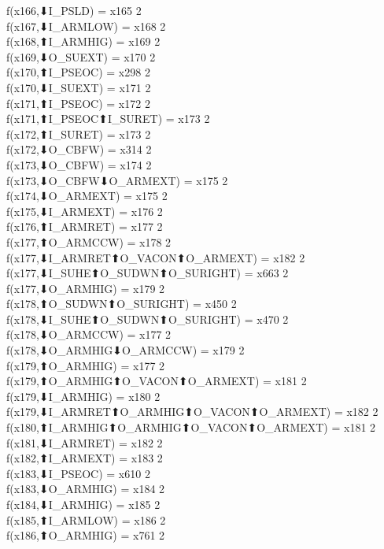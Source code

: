 f(x166,⬇I_PSLD) = x165 {2} \\
f(x167,⬇I_ARMLOW) = x168 {2} \\
f(x168,⬆I_ARMHIG) = x169 {2} \\
f(x169,⬇O_SUEXT) = x170 {2} \\
f(x170,⬆I_PSEOC) = x298 {2} \\
f(x170,⬇I_SUEXT) = x171 {2} \\
f(x171,⬆I_PSEOC) = x172 {2} \\
f(x171,⬆I_PSEOC⬆I_SURET) = x173 {2} \\
f(x172,⬆I_SURET) = x173 {2} \\
f(x172,⬇O_CBFW) = x314 {2} \\
f(x173,⬇O_CBFW) = x174 {2} \\
f(x173,⬇O_CBFW⬇O_ARMEXT) = x175 {2} \\
f(x174,⬇O_ARMEXT) = x175 {2} \\
f(x175,⬇I_ARMEXT) = x176 {2} \\
f(x176,⬆I_ARMRET) = x177 {2} \\
f(x177,⬆O_ARMCCW) = x178 {2} \\
f(x177,⬇I_ARMRET⬆O_VACON⬆O_ARMEXT) = x182 {2} \\
f(x177,⬇I_SUHE⬆O_SUDWN⬆O_SURIGHT) = x663 {2} \\
f(x177,⬇O_ARMHIG) = x179 {2} \\
f(x178,⬆O_SUDWN⬆O_SURIGHT) = x450 {2} \\
f(x178,⬇I_SUHE⬆O_SUDWN⬆O_SURIGHT) = x470 {2} \\
f(x178,⬇O_ARMCCW) = x177 {2} \\
f(x178,⬇O_ARMHIG⬇O_ARMCCW) = x179 {2} \\
f(x179,⬆O_ARMHIG) = x177 {2} \\
f(x179,⬆O_ARMHIG⬆O_VACON⬆O_ARMEXT) = x181 {2} \\
f(x179,⬇I_ARMHIG) = x180 {2} \\
f(x179,⬇I_ARMRET⬆O_ARMHIG⬆O_VACON⬆O_ARMEXT) = x182 {2} \\
f(x180,⬆I_ARMHIG⬆O_ARMHIG⬆O_VACON⬆O_ARMEXT) = x181 {2} \\
f(x181,⬇I_ARMRET) = x182 {2} \\
f(x182,⬆I_ARMEXT) = x183 {2} \\
f(x183,⬇I_PSEOC) = x610 {2} \\
f(x183,⬇O_ARMHIG) = x184 {2} \\
f(x184,⬇I_ARMHIG) = x185 {2} \\
f(x185,⬆I_ARMLOW) = x186 {2} \\
f(x186,⬆O_ARMHIG) = x761 {2} \\
